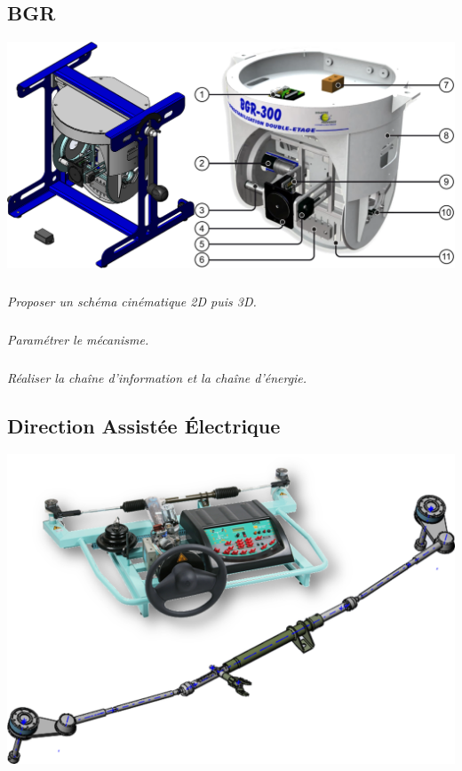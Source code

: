 \documentclass[10pt,fleqn]{article} %
\begin{document}

\vspace{4.5cm}
\pagestyle{fancy}
\thispagestyle{plain}


\def\columnseprulecolor{\color{ocre}}
\setlength{\columnseprule}{0.4pt} 

\begin{multicols}{2}
\subsection*{BGR}
\setcounter{exo}{0}

\begin{center}
\includegraphics[width=\linewidth]{images/bgr_01}
\end{center}

\subparagraph{}
\textit{Proposer un schéma cinématique 2D puis 3D.}

\subparagraph{}
\textit{Paramétrer le mécanisme.}


\subparagraph{}
\textit{Réaliser la chaîne d'information et la chaîne d'énergie.}






\subsection*{Direction Assistée Électrique}
\setcounter{exo}{0}
\begin{center}
\includegraphics[width=\linewidth]{images/dae_02}
\end{center}


\end{multicols}
\end{document}
